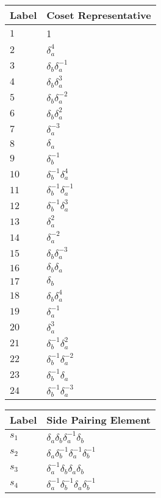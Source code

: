 \documentclass{article}
\begin{document}

\begin{center}
\begin{tabular}{ll}
\toprule
Label & Coset Representative\\
\midrule
$1$ & 1 \\
$2$ & $\delta_a^{4}$ \\
$3$ & $\delta_b^{}\delta_a^{-1}$ \\
$4$ & $\delta_b^{}\delta_a^{3}$ \\
$5$ & $\delta_b^{}\delta_a^{-2}$ \\
$6$ & $\delta_b^{}\delta_a^{2}$ \\
$7$ & $\delta_a^{-3}$ \\
$8$ & $\delta_a^{}$ \\
$9$ & $\delta_b^{-1}$ \\
$10$ & $\delta_b^{-1}\delta_a^{4}$ \\
$11$ & $\delta_b^{-1}\delta_a^{-1}$ \\
$12$ & $\delta_b^{-1}\delta_a^{3}$ \\
$13$ & $\delta_a^{2}$ \\
$14$ & $\delta_a^{-2}$ \\
$15$ & $\delta_b^{}\delta_a^{-3}$ \\
$16$ & $\delta_b^{}\delta_a^{}$ \\
$17$ & $\delta_b^{}$ \\
$18$ & $\delta_b^{}\delta_a^{4}$ \\
$19$ & $\delta_a^{-1}$ \\
$20$ & $\delta_a^{3}$ \\
$21$ & $\delta_b^{-1}\delta_a^{2}$ \\
$22$ & $\delta_b^{-1}\delta_a^{-2}$ \\
$23$ & $\delta_b^{-1}\delta_a^{}$ \\
$24$ & $\delta_b^{-1}\delta_a^{-3}$ \\
\bottomrule
\end{tabular}
\hfill
\begin{tabular}{ll}
\toprule
Label & Side Pairing Element\\
\midrule
$s_{1}$ & $\delta_a^{}\delta_b^{}\delta_a^{-1}\delta_b^{}$ \\
$s_{2}$ & $\delta_a^{}\delta_b^{-1}\delta_a^{-1}\delta_b^{-1}$ \\
$s_{3}$ & $\delta_a^{-1}\delta_b^{}\delta_a^{}\delta_b^{}$ \\
$s_{4}$ & $\delta_a^{-1}\delta_b^{-1}\delta_a^{}\delta_b^{-1}$ \\

\end{tabular}
\end{center}
\end{document}

